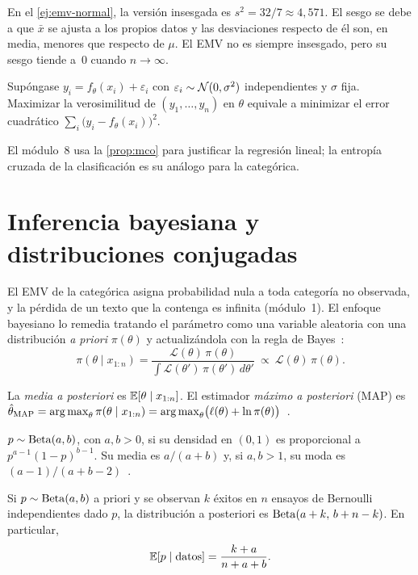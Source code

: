 En el \cref{ej:emv-normal}, la versión insesgada es $s^{2}=32/7\approx 4{,}571$. El sesgo se debe a que $\bar x$ se ajusta a los propios datos y las desviaciones respecto de él son, en media, menores que respecto de $\mu$. El EMV no es siempre insesgado, pero su sesgo tiende a~0 cuando $n\to\infty$.

\begin{proposicion}\label{prop:mco}
Supóngase $y_i=f_\theta(x_i)+\varepsilon_i$ con $\varepsilon_i\sim\mathcal{N}(0,\sigma^{2})$ independientes y $\sigma$ fija. Maximizar la verosimilitud de $(y_1,\dots,y_n)$ en $\theta$ equivale a minimizar el error cuadrático $\sum_i\bigl(y_i-f_\theta(x_i)\bigr)^{2}$.
\end{proposicion}

El módulo~8 usa la \cref{prop:mco} para justificar la regresión lineal; la entropía cruzada de la clasificación es su análogo para la categórica.

\section{Inferencia bayesiana y distribuciones conjugadas}

El EMV de la categórica asigna probabilidad nula a toda categoría no observada, y la pérdida de un texto que la contenga es infinita (módulo~1). El enfoque bayesiano lo remedia tratando el parámetro como una variable aleatoria con una distribución \emph{a priori} $\pi(\theta)$ y actualizándola con la regla de Bayes~\cite[§8.1]{bt}:
\[
\pi(\theta\mid x_{1:n})=\frac{\mathcal{L}(\theta)\,\pi(\theta)}{\int\mathcal{L}(\theta')\,\pi(\theta')\,d\theta'}\ \propto\ \mathcal{L}(\theta)\,\pi(\theta).
\]

\begin{definicion}
La \emph{media a posteriori} es $\mathbb{E}[\theta\mid x_{1:n}]$. El estimador \emph{máximo a posteriori} (MAP) es $\hat\theta_{\mathrm{MAP}}=\operatorname*{arg\,max}_\theta\pi(\theta\mid x_{1:n})=\operatorname*{arg\,max}_\theta\bigl(\ell(\theta)+\ln\pi(\theta)\bigr)$~\cite[§8.2]{bt}.
\end{definicion}

\begin{definicion}
$p\sim\operatorname{Beta}(a,b)$, con $a,b>0$, si su densidad en $(0,1)$ es proporcional a $p^{a-1}(1-p)^{b-1}$. Su media es $a/(a+b)$ y, si $a,b>1$, su moda es $(a-1)/(a+b-2)$~\cite[§2.1.1]{bishop}.
\end{definicion}

\begin{teorema}\label{teo:beta}
Si $p\sim\operatorname{Beta}(a,b)$ a priori y se observan $k$ éxitos en $n$ ensayos de Bernoulli independientes dado $p$, la distribución a posteriori es $\operatorname{Beta}(a+k,\,b+n-k)$. En particular,
\[
\mathbb{E}[p\mid\text{datos}]=\frac{k+a}{n+a+b}.
\]
\end{teorema}

